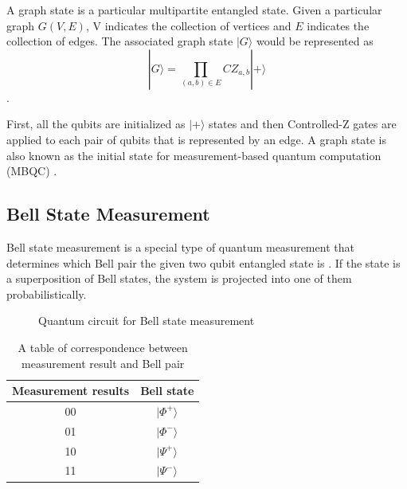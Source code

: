 A graph state is a particular multipartite entangled state. 
Given a particular graph $G(V, E)$, V indicates the collection of vertices and $E$ indicates the collection of edges.
The associated graph state $|G\rangle$ would be represented as 
\begin{equation}
  |G\rangle = \prod_{(a,b) \in E} CZ_{a,b} |+\rangle
\end{equation}.

First, all the qubits are initialized as $|+ \rangle$ states and then Controlled-Z gates are applied to each pair of qubits that is represented by an edge.
A graph state is also known as the initial state for measurement-based quantum computation (MBQC) \cite{PhysRevLett.86.5188}. 

\subsection{Bell State Measurement}
Bell state measurement is a special type of quantum measurement that determines which Bell pair the given two qubit entangled state is \cite{PhysRevA.59.3295}.
If the state is a superposition of Bell states, the system is projected into one of them probabilistically.

\begin{figure}[ht]
  \begin{center}
\caption{Quantum circuit for Bell state measurement}
\end{center}
\end{figure}

\begin{table}[ht]
  \begin{center}
    \begin{tabular}{|c|c|} \hline
      Measurement results & Bell state \\ \hline \cline{1-2}
      00 &  $|\Phi^+\rangle$ \\ \cline{1-2}
      01 & $|\Phi^-\rangle$ \\  \cline{1-2}
      10 &  $|\Psi^+\rangle$ \\ \cline{1-2}
      11 & $|\Psi^-\rangle$ \\  \hline  \cline{1-2}
    \end{tabular}
    \caption{A table of correspondence between measurement result and Bell pair}
  \end{center}
\end{table}

